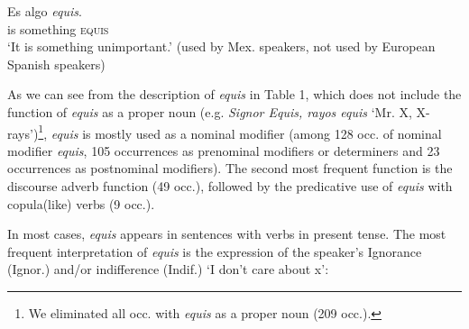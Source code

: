 \documentclass[output=paper
,modfonts
,nonflat]{langsci/langscibook}
\begin{document}
\ea
\gll Es algo \textit{equis}.\\
is something \textsc{equis}\\
\glt ‘It is something unimportant.’
(used by Mex. speakers, not used by European Spanish speakers)
\z

As we can see from the description of \textit{equis} in Table 1, which does not include the function of \textit{equis} as a proper noun (e.g. \textit{Signor Equis, rayos equis} ‘Mr. X, X-rays’)\footnote{We eliminated all occ. with \textit{equis} as a proper noun (209 occ.).}, \textit{equis} is mostly used as a nominal modifier (among 128 occ. of nominal modifier \textit{equis}, 105 occurrences as prenominal modifiers or determiners and 23 occurrences as postnominal modifiers). The second most frequent function is the discourse adverb function (49 occ.), followed by the predicative use of \textit{equis} with copula(like) verbs (9 occ.). 

In most cases, \textit{equis} appears in sentences with verbs in present tense. The most frequent interpretation of \textit{equis} is the expression of the speaker’s Ignorance (Ignor.) and/or indifference (Indif.) ‘I don’t care about x’:
\end{document}

